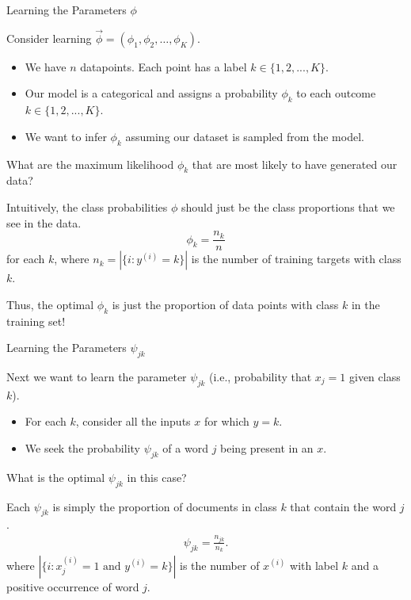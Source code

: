 \documentclass[../../generative_classifiers.tex]{subfiles}
\begin{document}
\begin{frame}[fragile]{Learning the Parameters $\phi$}


Consider learning $\vec \phi = (\phi_1, \phi_2, \ldots, \phi_K)$. 

\begin{itemize}
    \item We have $n$ datapoints. Each point has a label $k\in\{1,2,...,K\}$.
    \item Our model is a categorical and assigns a probability $\phi_k$ to each outcome $k\in\{1,2,...,K\}$.
    \item We want to infer $\phi_k$ assuming our dataset is sampled from the model.
\end{itemize}

What are the maximum likelihood $\phi_k$ that are most likely to have generated our data?

\vspace{0.2cm}

Intuitively, the class probabilities $\phi$ should just be the class proportions that we see in the data. 
$$ \phi_k = \frac{n_k}{n}$$
for each $k$, where $n_k = |\{i : y^{(i)} = k\}|$ is the number of training targets with class $k$.

Thus, the optimal $\phi_k$ is just the proportion of data points with class $k$ in the training set!
\end{frame}

\begin{frame}[fragile]{Learning the Parameters $\psi_{jk}$}

Next we want to learn the parameter $\psi_{jk}$ (i.e., probability that $x_j=1$ given class $k$).

 \begin{itemize}
     \item For each $k$, consider all the inputs $x$ for which $y=k$.
     \item We seek  the probability $\psi_{jk}$ of a word $j$ being present in an $x$.
 \end{itemize}


What is the optimal $\psi_{jk}$ in this case?

\vspace{0.2cm}

Each $\psi_{jk}$ is simply the proportion of documents in class $k$ that contain the word $j$.
\begin{align*}
\psi_{jk} = \frac{n_{jk}}{n_k}.
\end{align*}
where $|\{i : x^{(i)}_j = 1 \text{ and } y^{(i)} = k\}|$ is the number of $x^{(i)}$ with label $k$ and a positive occurrence of word $j$.

\end{frame}
\end{document}
